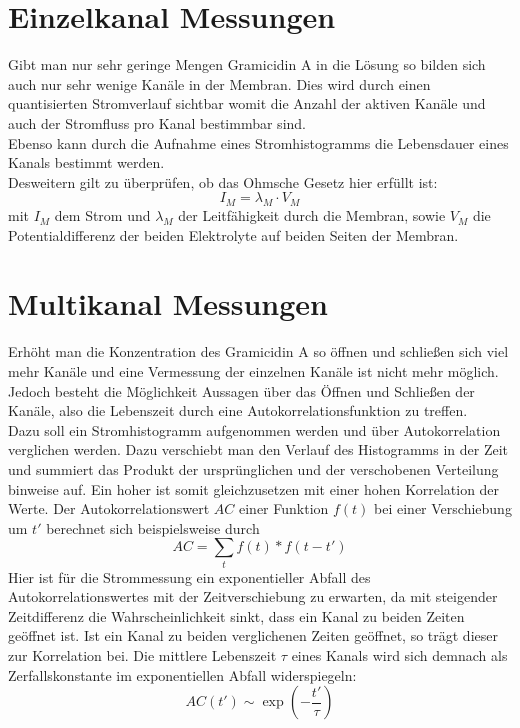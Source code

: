 \documentclass{include/thesisclass3}
\newcommand{\cc}{\cdot}
\begin{document}


\section{Einzelkanal Messungen}
Gibt man nur sehr geringe Mengen Gramicidin A in die Lösung so bilden sich auch nur sehr wenige Kanäle in der Membran. Dies wird durch einen quantisierten Stromverlauf sichtbar womit die Anzahl der aktiven Kanäle und auch der Stromfluss pro Kanal bestimmbar sind.\\
Ebenso kann durch die Aufnahme eines Stromhistogramms die Lebensdauer eines Kanals bestimmt werden.\\
Desweitern gilt zu überprüfen, ob das Ohmsche Gesetz hier erfüllt ist:
\[ I_M = \lambda_M \cc V_M\]
mit $I_M$ dem Strom und $\lambda_M$ der Leitfähigkeit durch die Membran, sowie $V_M$ die Potentialdifferenz der beiden Elektrolyte auf beiden Seiten der Membran.


\section{Multikanal Messungen}
Erhöht man die Konzentration des Gramicidin A so öffnen und schließen sich viel mehr Kanäle und eine Vermessung der einzelnen Kanäle ist nicht mehr möglich. Jedoch besteht die Möglichkeit Aussagen über das Öffnen und Schließen der Kanäle, also die Lebenszeit durch eine Autokorrelationsfunktion zu treffen.\\
Dazu soll ein Stromhistogramm aufgenommen werden und über Autokorrelation verglichen werden. Dazu verschiebt man den Verlauf des Histogramms in der Zeit und summiert das Produkt der ursprünglichen und der verschobenen Verteilung binweise auf. Ein hoher ist somit gleichzusetzen mit einer hohen Korrelation der Werte. Der Autokorrelationswert $AC$ einer Funktion $f(t)$ bei einer Verschiebung um $t'$ berechnet sich beispielsweise durch
\[ AC = \sum_t f(t)*f(t-t') \]
Hier ist für die Strommessung ein exponentieller Abfall des Autokorrelationswertes mit der Zeitverschiebung zu erwarten, da mit steigender Zeitdifferenz die Wahrscheinlichkeit sinkt, dass ein Kanal zu beiden Zeiten geöffnet ist. Ist ein Kanal zu beiden verglichenen Zeiten geöffnet, so trägt dieser zur Korrelation bei. Die mittlere Lebenszeit $\tau$ eines Kanals wird sich demnach als Zerfallskonstante im exponentiellen Abfall widerspiegeln:
\[ AC(t') \sim \exp\left( - \frac{t'}{\tau}\right)\]
\end{document}

